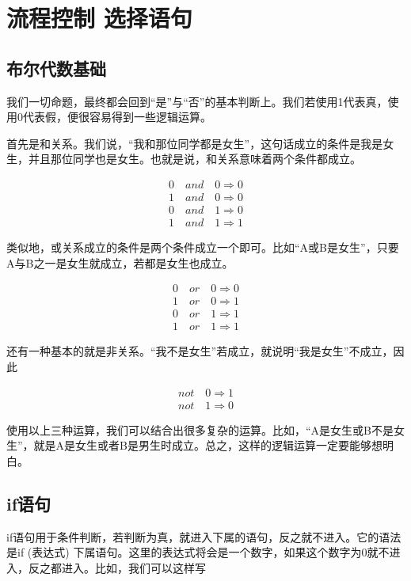 \section{流程控制 选择语句}

\subsection{布尔代数基础}

我们一切命题，最终都会回到“是”与“否”的基本判断上。我们若使用1代表真，使用0代表假，便很容易得到一些逻辑运算。

首先是和关系。我们说，“我和那位同学都是女生”，这句话成立的条件是我是女生，并且那位同学也是女生。也就是说，和关系意味着两个条件都成立。

\begin{align*}
    0\quad and\quad 0 \Rightarrow 0\\
    1\quad and\quad 0 \Rightarrow 0\\
    0\quad and\quad 1 \Rightarrow 0\\
    1\quad and\quad 1 \Rightarrow 1
\end{align*}

类似地，或关系成立的条件是两个条件成立一个即可。比如“A或B是女生”，只要A与B之一是女生就成立，若都是女生也成立。

\begin{align*}
    0\quad or\quad 0 \Rightarrow 0\\
    1\quad or\quad 0 \Rightarrow 1\\
    0\quad or\quad 1 \Rightarrow 1\\
    1\quad or\quad 1 \Rightarrow 1
\end{align*}

还有一种基本的就是非关系。“我不是女生”若成立，就说明“我是女生”不成立，因此

\begin{align*}
    not\quad 0 \Rightarrow 1\\
    not\quad 1 \Rightarrow 0 
\end{align*}

使用以上三种运算，我们可以结合出很多复杂的运算。比如，“A是女生或B不是女生”，就是A是女生或者B是男生时成立。总之，这样的逻辑运算一定要能够想明白。

\subsection{if语句}

if语句用于条件判断，若判断为真，就进入下属的语句，反之就不进入。它的语法是if (表达式) 下属语句。这里的表达式将会是一个数字，如果这个数字为0就不进入，反之都进入。比如，我们可以这样写

